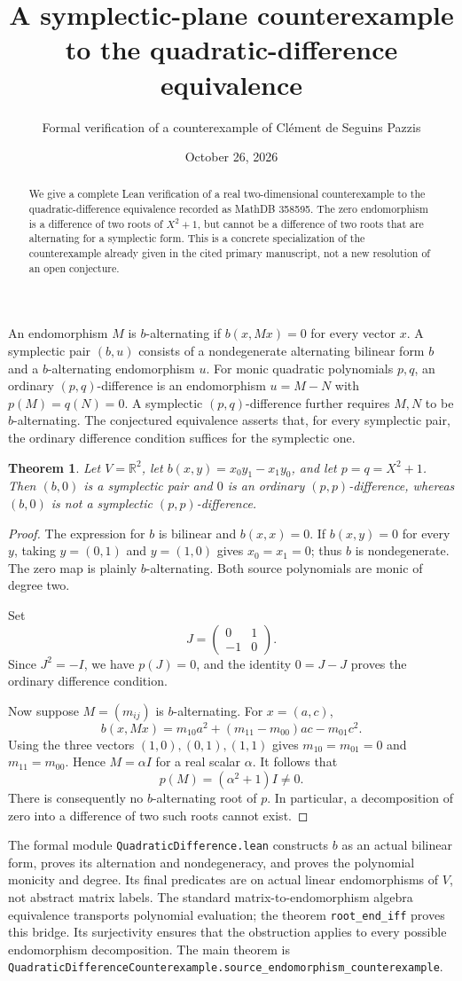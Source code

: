 \documentclass[11pt]{article}
\title{A symplectic-plane counterexample to the quadratic-difference equivalence}
\author{Formal verification of a counterexample of Cl\'ement de Seguins Pazzis}
\date{October 26, 2026}
\newtheorem{theorem}{Theorem}
\begin{document}
\maketitle
\begin{abstract}
We give a complete Lean verification of a real two-dimensional counterexample to the quadratic-difference equivalence recorded as MathDB 358595. The zero endomorphism is a difference of two roots of $X^2+1$, but cannot be a difference of two roots that are alternating for a symplectic form. This is a concrete specialization of the counterexample already given in the cited primary manuscript, not a new resolution of an open conjecture.
\end{abstract}
An endomorphism $M$ is $b$-alternating if $b(x,Mx)=0$ for every vector $x$. A symplectic pair $(b,u)$ consists of a nondegenerate alternating bilinear form $b$ and a $b$-alternating endomorphism $u$. For monic quadratic polynomials $p,q$, an ordinary $(p,q)$-difference is an endomorphism $u=M-N$ with $p(M)=q(N)=0$. A symplectic $(p,q)$-difference further requires $M,N$ to be $b$-alternating. The conjectured equivalence asserts that, for every symplectic pair, the ordinary difference condition suffices for the symplectic one.
\begin{theorem}
Let $V=\mathbb R^2$, let $b(x,y)=x_0y_1-x_1y_0$, and let $p=q=X^2+1$. Then $(b,0)$ is a symplectic pair and $0$ is an ordinary $(p,p)$-difference, whereas $(b,0)$ is not a symplectic $(p,p)$-difference.
\end{theorem}
\begin{proof}
The expression for $b$ is bilinear and $b(x,x)=0$. If $b(x,y)=0$ for every $y$, taking $y=(0,1)$ and $y=(1,0)$ gives $x_0=x_1=0$; thus $b$ is nondegenerate. The zero map is plainly $b$-alternating. Both source polynomials are monic of degree two.

Set
\[
 J=\begin{pmatrix}0&1\\-1&0\end{pmatrix}.
\]
Since $J^2=-I$, we have $p(J)=0$, and the identity $0=J-J$ proves the ordinary difference condition.

Now suppose $M=(m_{ij})$ is $b$-alternating. For $x=(a,c)$,
\[
 b(x,Mx)=m_{10}a^2+(m_{11}-m_{00})ac-m_{01}c^2.
\]
Using the three vectors $(1,0),(0,1),(1,1)$ gives
$m_{10}=m_{01}=0$ and $m_{11}=m_{00}$. Hence $M=\alpha I$ for a real scalar $\alpha$. It follows that
\[
 p(M)=(\alpha^2+1)I\ne0.
\]
There is consequently no $b$-alternating root of $p$. In particular, a decomposition of zero into a difference of two such roots cannot exist.
\end{proof}
The formal module \texttt{QuadraticDifference.lean} constructs $b$ as an actual bilinear form, proves its alternation and nondegeneracy, and proves the polynomial monicity and degree. Its final predicates are on actual linear endomorphisms of $V$, not abstract matrix labels. The standard matrix-to-endomorphism algebra equivalence transports polynomial evaluation; the theorem \texttt{root\_end\_iff} proves this bridge. Its surjectivity ensures that the obstruction applies to every possible endomorphism decomposition. The main theorem is \texttt{QuadraticDifferenceCounterexample.source\_endomorphism\_counterexample}.
\end{document}
